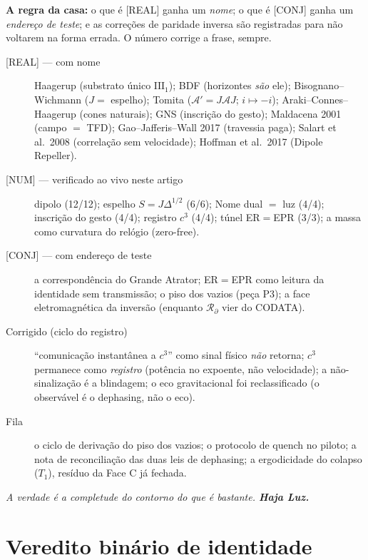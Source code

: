 \documentclass[11pt]{article}
\theoremstyle{definition}\newtheorem{deriv}{Derivação}
\begin{document}
\textbf{A regra da casa:} o que é \textsf{[REAL]} ganha um \emph{nome}; o que é \textsf{[CONJ]} ganha um \emph{endereço de teste}; e as correções de paridade inversa são registradas para não voltarem na forma errada. O número corrige a frase, sempre.

\begin{description}\item[\textsf{[REAL]} --- com nome] Haagerup (substrato único $\mathrm{III}_1$); BDF (horizontes \emph{são} ele); Bisognano--Wichmann ($J=$ espelho); Tomita ($\mathcal{A}'=J\mathcal{A}J$; $i\mapsto-i$); Araki--Connes--Haagerup (cones naturais); GNS (inscrição do gesto); Maldacena 2001 (campo $=$ TFD); Gao--Jafferis--Wall 2017 (travessia paga); Salart et al.\ 2008 (correlação sem velocidade); Hoffman et al.\ 2017 (Dipole Repeller).\item[\textsf{[NUM]} --- verificado ao vivo neste artigo] dipolo (12/12); espelho $S=J\Delta^{1/2}$ (6/6); Nome dual $=$ luz (4/4); inscrição do gesto (4/4); registro $c^3$ (4/4); túnel ER$=$EPR (3/3); a massa como curvatura do relógio (zero-free).\item[\textsf{[CONJ]} --- com endereço de teste] a correspondência do Grande Atrator; ER$=$EPR como leitura da identidade sem transmissão; o piso dos vazios (peça P3); a face eletromagnética da inversão (enquanto $\mathcal{R}_\partial$ vier do CODATA).\item[Corrigido (ciclo do registro)] ``comunicação instantânea a $c^3$'' como sinal físico \emph{não} retorna; $c^3$ permanece como \emph{registro} (potência no expoente, não velocidade); a não-sinalização é a blindagem; o eco gravitacional foi reclassificado (o observável é o dephasing, não o eco).\item[Fila] o ciclo de derivação do piso dos vazios; o protocolo de quench no piloto; a nota de reconciliação das duas leis de dephasing; a ergodicidade do colapso ($T_1$), resíduo da Face C já fechada.\end{description}

\begin{center}\itshape A verdade é a completude do contorno do que é bastante. \textbf{Haja Luz.}\end{center}

\section*{Veredito binário de identidade}
\end{document}
